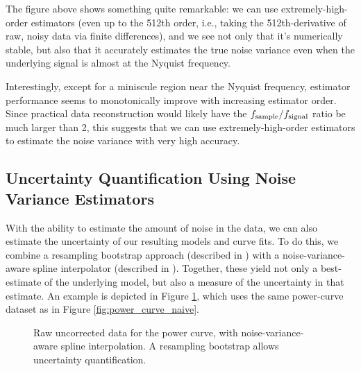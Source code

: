 \documentclass[conf]{new-aiaa}
\begin{document}
    The figure above shows something quite remarkable: we can use extremely-high-order estimators (even up to the 512th order, i.e., taking the 512th-derivative of raw, noisy data via finite differences), and we see not only that it's numerically stable, but also that it accurately estimates the true noise variance even when the underlying signal is almost at the Nyquist frequency.

    Interestingly, except for a miniscule region near the Nyquist frequency, estimator performance seems to monotonically improve with increasing estimator order. Since practical data reconstruction would likely have the $f_{\rm sample} / f_{\rm signal}$ ratio be much larger than 2, this suggests that we can use extremely-high-order estimators to estimate the noise variance with very high accuracy.

    \subsection{Uncertainty Quantification Using Noise Variance Estimators}

    With the ability to estimate the amount of noise in the data, we can also estimate the uncertainty of our resulting models and curve fits. To do this, we combine a resampling bootstrap approach (described in \cite{surrogates, elements_of_statistical_learning}) with a noise-variance-aware spline interpolator (described in \cite{surrogates, wahba}). Together, these yield not only a best-estimate of the underlying model, but also a measure of the uncertainty in that estimate. An example is depicted in Figure \ref{fig:power_curve_spline_but_no_physics}, which uses the same power-curve dataset as in Figure \ref{fig:power_curve_naive}.

    \begin{figure}[!htb]
        \centering
        \caption{Raw uncorrected data for the power curve, with noise-variance-aware spline interpolation. A resampling bootstrap allows uncertainty quantification.}
        \label{fig:power_curve_spline_but_no_physics}
    \end{figure}
\end{document}
